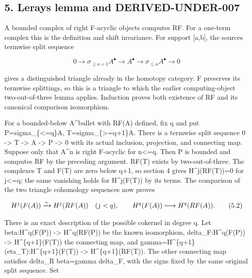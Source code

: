 \documentclass[11pt]{article}
\begin{document}
\subsection{5. Leray\textquotesingle s lemma and DERIVED-UNDER-007}\label{proofs-5091-5900-lerays-lemma-and-derived-under-007}

A bounded complex of right F-acyclic objects computes RF. For a one-term complex this is the definition and shift invariance. For support [a,\allowbreak{}b]\allowbreak{},\allowbreak{} the source\textquotesingle s termwise split sequence

\[
0\to\sigma_{\ge a+1}A^\bullet\to A^\bullet
                      \to\sigma_{\le a}A^\bullet\to0          \tag{5.1}
\]

gives a distinguished triangle already in the homotopy category. F preserves its termwise splittings,\allowbreak{} so this is a triangle to which the earlier computing-object two-out-of-three lemma applies. Induction proves both existence of RF and its canonical comparison isomorphism.

For a bounded-below A\^{}bullet with RF(A)\allowbreak{} defined,\allowbreak{} fix q and put P\allowbreak{}=sigma\_\allowbreak{}\{<\allowbreak{}=q\}A,\allowbreak{} T\allowbreak{}=sigma\_\allowbreak{}\{>\allowbreak{}=q\allowbreak{}+1\}A. There is a termwise split sequence 0 \allowbreak{}-> T \allowbreak{}-> A \allowbreak{}-> P \allowbreak{}-> 0 with its actual inclusion,\allowbreak{} projection,\allowbreak{} and connecting map. Suppose only that A\^{}n is right F-acyclic for n<\allowbreak{}=q. Then P is bounded and computes RF by the preceding argument. RF(T)\allowbreak{} exists by two-out-of-three. The complexes T and F(T)\allowbreak{} are zero below q\allowbreak{}+1,\allowbreak{} so section 4 gives H\textasciicircum{}j(RF(T)\allowbreak{})\allowbreak{}\allowbreak{}=0 for j<\allowbreak{}=q; the same vanishing holds for H\textasciicircum{}j(F(T)\allowbreak{})\allowbreak{} by its terms. The comparison of the two triangle cohomology sequences now proves

\[
 H^j(F(A))\xrightarrow{\sim}H^j(RF(A))\quad(j<q),
 \qquad H^q(F(A))\lhook\joinrel\longrightarrow H^q(RF(A)). \tag{5.2}
\]

There is an exact description of the possible cokernel in degree q. Let beta:\allowbreak{}H\textasciicircum{}q(F(P)\allowbreak{})\allowbreak{} \allowbreak{}-> H\textasciicircum{}q(RF(P)\allowbreak{})\allowbreak{} be the known isomorphism,\allowbreak{} delta\_\allowbreak{}F:\allowbreak{}H\textasciicircum{}q(F(P)\allowbreak{})\allowbreak{} \allowbreak{}-> H\textasciicircum{}\{q\allowbreak{}+1\}(F(T)\allowbreak{})\allowbreak{} the connecting map,\allowbreak{} and gamma\allowbreak{}=H\textasciicircum{}\{q\allowbreak{}+1\}(eta\_\allowbreak{}T)\allowbreak{}:\allowbreak{}H\textasciicircum{}\{q\allowbreak{}+1\}(F(T)\allowbreak{})\allowbreak{} \allowbreak{}-> H\textasciicircum{}\{q\allowbreak{}+1\}(RF(T)\allowbreak{})\allowbreak{}. The other connecting map satisfies delta\_\allowbreak{}R beta\allowbreak{}=gamma delta\_\allowbreak{}F,\allowbreak{} with the signs fixed by the same original split sequence. Set
\end{document}
